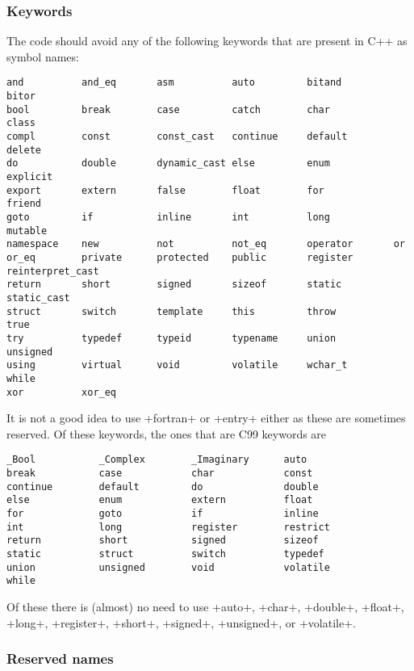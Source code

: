 \documentclass[10pt]{ligodcc}
\makeatletter
\def\verb{\relax\ifmmode\hbox\else\leavevmode\null\fi
  \bgroup
    \color{blue}\small
    \verb@eol@error \let\do\@makeother \dospecials
    \verbatim@font\@noligs
    \@ifstar\@sverb\@verb}
\makeatother
\begin{document}
\subsubsection*{Keywords}

The code should avoid any of the following
keywords that are present in C++ as symbol names:
\begin{verbatim}
and          and_eq       asm          auto         bitand         bitor
bool         break        case         catch        char           class
compl        const        const_cast   continue     default        delete
do           double       dynamic_cast else         enum           explicit
export       extern       false        float        for            friend
goto         if           inline       int          long           mutable
namespace    new          not          not_eq       operator       or
or_eq        private      protected    public       register       reinterpret_cast
return       short        signed       sizeof       static         static_cast
struct       switch       template     this         throw          true
try          typedef      typeid       typename     union          unsigned
using        virtual      void         volatile     wchar_t        while
xor          xor_eq
\end{verbatim}
It is not a good idea to use \verb+fortran+ or \verb+entry+ either as these
are sometimes reserved.  Of these keywords, the ones that are C99 keywords are
\begin{verbatim}
_Bool           _Complex        _Imaginary      auto
break           case            char            const
continue        default         do              double
else            enum            extern          float
for             goto            if              inline
int             long            register        restrict
return          short           signed          sizeof
static          struct          switch          typedef
union           unsigned        void            volatile
while
\end{verbatim}
Of these there is (almost) no need to use \verb+auto+, \verb+char+,
\verb+double+, \verb+float+, \verb+long+, \verb+register+, \verb+short+,
\verb+signed+, \verb+unsigned+, or \verb+volatile+.

\subsubsection*{Reserved names}
\end{document}
